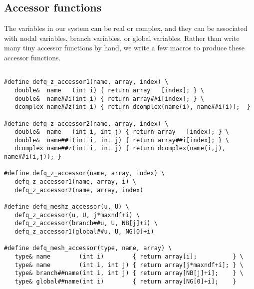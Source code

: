 \subsection{Accessor functions}

The variables in our system can be real or complex, and they can be
associated with nodal variables, branch variables, or global variables.
Rather than write many tiny accessor functions by hand, we write a
few macros to produce these accessor functions.

\begin{verbatim}

#define defq_z_accessor1(name, array, index) \
   double&  name   (int i) { return array   [index]; } \
   double&  name##i(int i) { return array##i[index]; } \
   dcomplex name##z(int i) { return dcomplex(name(i), name##i(i));  }

#define defq_z_accessor2(name, array, index) \
   double&  name   (int i, int j) { return array   [index]; } \
   double&  name##i(int i, int j) { return array##i[index]; } \
   dcomplex name##z(int i, int j) { return dcomplex(name(i,j), name##i(i,j)); }

#define defq_z_accessor(name, array, index) \
   defq_z_accessor1(name, array, i) \
   defq_z_accessor2(name, array, index)

#define defq_meshz_accessor(u, U) \
   defq_z_accessor(u, U, j*maxndf+i) \
   defq_z_accessor(branch##u, U, NB[j]+i) \
   defq_z_accessor1(global##u, U, NG[0]+i)

#define defq_mesh_accessor(type, name, array) \
   type& name        (int i)        { return array[i];          } \
   type& name        (int i, int j) { return array[j*maxndf+i]; } \
   type& branch##name(int i, int j) { return array[NB[j]+i];    } \
   type& global##name(int i)        { return array[NG[0]+i];    }


\end{verbatim}
